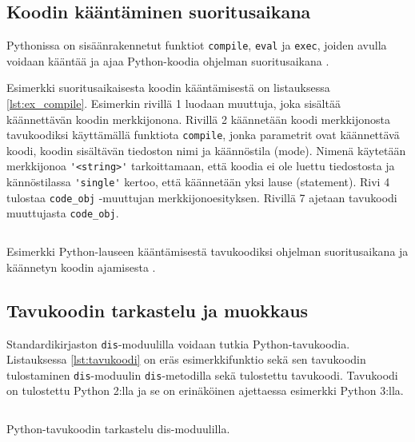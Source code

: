 \documentclass[finnish]{tktltiki2}
\theoremstyle{definition}
\theoremstyle{remark}
\begin{document}

\subsection{Koodin kääntäminen suoritusaikana}

Pythonissa on sisäänrakennetut funktiot \verb|compile|, \verb|eval| ja \verb|exec|, joiden avulla voidaan kääntää ja ajaa Python-koodia ohjelman suoritusaikana \cite{codeobjects,martelli2006python}.

Esimerkki suoritusaikaisesta koodin kääntämisestä on listauksessa \ref{lst:ex_compile}. Esimerkin rivillä 1 luodaan muuttuja, joka sisältää käännettävän koodin merkkijonona. Rivillä 2 käännetään koodi merkkijonosta tavukoodiksi käyttämällä funktiota \verb|compile|, jonka parametrit ovat käännettävä koodi, koodin sisältävän tiedoston nimi ja käännöstila (mode). Nimenä käytetään merkkijonoa \verb|'<string>'| tarkoittamaan, että koodia ei ole luettu tiedostosta ja kännöstilassa \verb|'single'| kertoo, että käännetään yksi lause (statement). Rivi 4 tulostaa \verb|code_obj| -muuttujan merkkijonoesityksen. Rivillä 7 ajetaan tavukoodi muuttujasta \verb|code_obj|.

\begin{listing}
    \inputminted[linenos]{python}{code/dynamichello.py}
    \caption{Esimerkki Python-lauseen kääntämisestä tavukoodiksi ohjelman suoritusaikana ja käännetyn koodin ajamisesta \cite{codeobjects}.}
    \label{lst:ex_compile}
\end{listing}


\subsection{Tavukoodin tarkastelu ja muokkaus}

Standardikirjaston \verb|dis|-moduulilla voidaan tutkia Python-tavukoodia. Listauksessa \ref{lst:tavukoodi} on eräs esimerkkifunktio sekä sen tavukoodin tulostaminen \verb|dis|-moduulin \verb|dis|-metodilla sekä tulostettu tavukoodi. Tavukoodi on tulostettu Python 2:lla ja se on erinäköinen ajettaessa esimerkki Python 3:lla.


\begin{listing}
    \inputminted[linenos]{python}{code/tavukoodi.py}
    \caption{Python-tavukoodin tarkastelu dis-moduulilla.}
    \label{lst:tavukoodi}
\end{listing}
\end{document}
